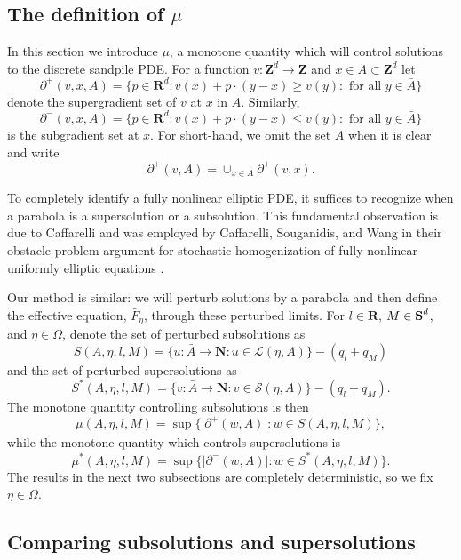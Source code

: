 \documentclass[12pt]{amsart}
\newcommand{\R}{\mathbf{R}}
\newcommand{\Z}{\mathbf{Z}}
\newcommand{\N}{\mathbf{N}}
\newcommand{\symm}{{\mbox{\bf S}}}  %
\begin{document}
\subsection{The definition of $\mu$} 
In this section we introduce $\mu$, a monotone quantity which will control solutions to the discrete sandpile PDE. 
For a function $v: \Z^d \to \Z$ and $x \in A \subset \Z^d$ let
\[
\partial^+(v, x,A)  = \{ p \in \R^d : v(x) + p \cdot (y-x) \geq v(y) : \mbox{ for all $y \in \bar{A}$}\}
\]
denote the supergradient set of $v$ at $x$ in $A$. Similarly, 
\[
\partial^-(v, x,A)  = \{ p \in \R^d : v(x) + p \cdot (y-x) \leq v(y) : \mbox{ for all $y \in \bar{A}$}\}
\]
is the subgradient set at $x$.  For short-hand, we omit the set $A$ when it is clear and write
\[
\partial^+(v, A) =  \cup_{x \in A} \partial^+(v,x). 
\]

To completely identify a fully nonlinear elliptic PDE, it suffices to recognize when a parabola is a supersolution or a subsolution. This fundamental observation is due to Caffarelli \cite{caffarelli1999note} and was employed by Caffarelli, Souganidis, and Wang in their obstacle problem argument for stochastic homogenization of fully nonlinear uniformly elliptic equations \cite{caffarelli2005homogenization, armstrong2014stochastic}.  


Our method is similar: we will perturb solutions by a parabola and then define the effective equation, $\bar{F}_{\eta}$, through these perturbed limits. For $l \in \R$, $M \in \symm^d$, and $\eta \in \Omega$, denote the set of perturbed subsolutions as
\[
S(A, \eta, l, M) =  \{ u: \bar{A} \to \N : u \in \mathcal{L}(\eta, A) \}  - \left( q_l  + q_M \right)
\] 
and the set of perturbed supersolutions as
\[
S^*(A, \eta, l, M) =   \{ v: \bar{A} \to \N : v \in \mathcal{S}(\eta, A)  \}  - \left( q_l + q_M \right). 
\]
The monotone quantity controlling subsolutions is then
\[
\mu(A, \eta, l, M) = \sup \{ |\partial^+(w,A)|:   w \in S(A, \eta, l, M) \},
\]
while the monotone quantity which controls supersolutions is
\[
\mu^*(A, \eta, l, M)  = \sup \{ |\partial^-(w,A)|: w \in S^*(A, \eta, l , M)  \}. 
\]
The results in the next two subsections are completely deterministic, so we fix $\eta \in \Omega$.



\subsection{Comparing subsolutions and supersolutions}
\end{document}
